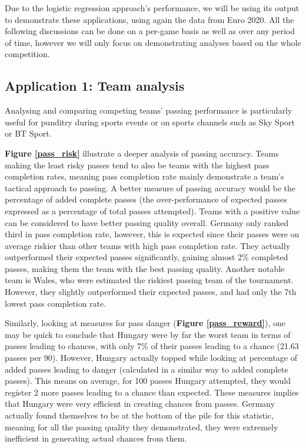 \documentclass[conference]{IEEEtran}
\begin{document}
Due to the logistic regression approach's performance, we will be using its output to demonstrate these applications, using again the data from Euro 2020. All the following discussions can be done on a per-game basis as well as over any period of time, however we will only focus on demonstrating analyses based on the whole competition.

\subsection{Application 1: Team analysis} \label{team}
Analysing and comparing competing teams' passing performance is particularly useful for punditry during sports events or on sports channels such as Sky Sport or BT Sport.

\textbf{Figure \ref{pass_risk}} illustrate a deeper analysis of passing accuracy. Teams making the least risky passes tend to also be teams with the highest pass completion rates, meaning pass completion rate mainly demonstrate a team's tactical approach to passing. A better measure of passing accuracy would be the percentage of added complete passes (the over-performance of expected passes expressed as a percentage of total passes attempted). Teams with a positive value can be considered to have better passing quality overall. Germany only ranked third in pass completion rate, however, this is expected since their passes were on average riskier than other teams with high pass completion rate. They actually outperformed their expected passes significantly, gaining almost 2\% completed passes, making them the team with the best passing quality. Another notable team is Wales, who were estimated the riskiest passing team of the tournament. However, they slightly outperformed their expected passes, and had only the 7th lowest pass completion rate.

Similarly, looking at measures for pass danger (\textbf{Figure \ref{pass_reward}}), one may be quick to conclude that Hungary were by far the worst team in terms of passes leading to chances, with only 7\% of their passes leading to a chance (21.63 passes per 90). However, Hungary actually topped while looking at percentage of added passes leading to danger (calculated in a similar way to added complete passes). This means on average, for 100 passes Hungary attempted, they would register 2 more passes leading to a chance than expected. These measures implies that Hungary were very efficient in creating chances from passes. Germany actually found themselves to be at the bottom of the pile for this statistic, meaning for all the passing quality they demonstrated, they were extremely inefficient in generating actual chances from them.
\end{document}
